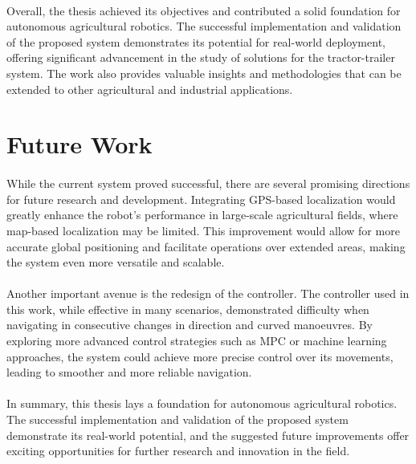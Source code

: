 \paragraph{}Overall, the thesis achieved its objectives and contributed a solid foundation for autonomous agricultural 
robotics. The successful implementation and validation of the proposed system demonstrates its potential for real-world 
deployment, offering significant advancement in the study of solutions for the tractor-trailer system. 
The work also provides valuable insights and methodologies that can be extended to other agricultural and 
industrial applications.


\section{Future Work}
\label{sec:future_work}
\paragraph{}While the current system proved successful, there are several promising directions 
for future research and development. Integrating GPS-based localization would greatly enhance 
the robot's performance in large-scale agricultural fields, where map-based localization 
may be limited. This improvement would allow for more accurate global positioning and 
facilitate operations over extended areas, making the system even more versatile and scalable.

\paragraph{}Another important avenue is the redesign of the controller. The controller used 
in this work, while effective in many scenarios, demonstrated difficulty when navigating in consecutive 
changes in direction and curved manoeuvres. By exploring more advanced control strategies 
such as \gls{MPC} or machine learning approaches, the system could achieve more precise 
control over its movements, leading to smoother and more reliable navigation.

\paragraph{}In summary, this thesis lays a foundation for autonomous 
agricultural robotics. The successful implementation and validation of the proposed 
system demonstrate its real-world potential, and the suggested future improvements offer 
exciting opportunities for further research and innovation in the field.

